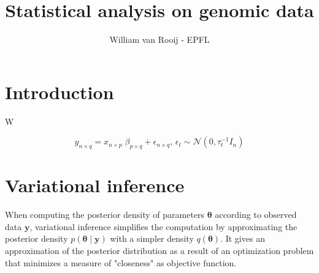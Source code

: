 \documentclass{article}
\numberwithin{equation}{section}
\begin{document}
\title{Statistical analysis on genomic data}
\author{William van Rooij - EPFL}

\maketitle

\newpage
\tableofcontents
\newpage
\section{Introduction}
W




\begin{equation*}
y_{n\times q} = x_{n \times p}\;\beta_{p \times q}+\epsilon_{n \times q}\text{, }\epsilon_t \sim \mathcal{N}(0,\tau_t^{-1}I_n)
\end{equation*}
\newpage
\section{Variational inference}
When computing the posterior density of parameters $\boldsymbol{\theta}$ according to observed data $\boldsymbol{y}$, variational inference simplifies the computation by approximating the posterior density $p(\boldsymbol{\theta}\mid \boldsymbol{y})$ with a simpler density $q(\boldsymbol{\theta})$. It gives an approximation of the posterior distribution as a result of an optimization problem that minimizes a measure of "closeness" as objective function.
\end{document}
